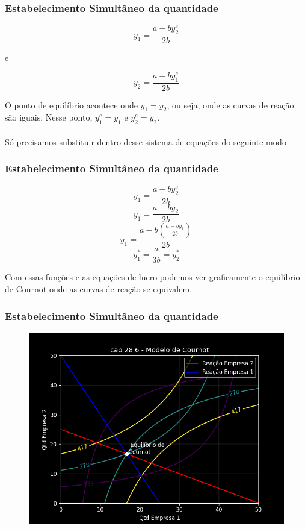 \documentclass{beamer}[10]
\begin{document}
\begin{frame}
	\frametitle{Estabelecimento Simultâneo da quantidade}

	$$ y_1 = \frac{a - by_2^e}{2b} $$

	e

	$$ y_2 = \frac{a - by_1^e}{2b} $$

	O ponto de equilíbrio acontece onde $y_1 = y_2$, ou seja, onde as curvas de reação são iguais. Nesse ponto, $y_1^e = y_1$ e $y_2^e = y_2$. 
	\\~\\
	Só precisamos substituir dentro desse sistema de equações do seguinte modo

\end{frame}

\begin{frame}
	\frametitle{Estabelecimento Simultâneo da quantidade}

	$$ y_1 = \frac{a - by_2^e}{2b} $$
	$$ y_1 = \frac{a - by_2}{2b} $$
	$$ y_1 = \frac{a - b(\frac{a - by_1}{2b})}{2b} $$
	$$ y_1^* = \frac{a}{3b} = y_2^* $$

	Com essas funções e as equações de lucro podemos ver graficamente o equilíbrio de Cournot onde as curvas de reação se equivalem.

\end{frame}

\begin{frame}
	\frametitle{Estabelecimento Simultâneo da quantidade}

	\begin{figure}[H]
		\centering
		\includegraphics[scale=0.55]{cap28_6-modelo_cournot.png}
	\end{figure}
	
\end{frame}
\end{document}
